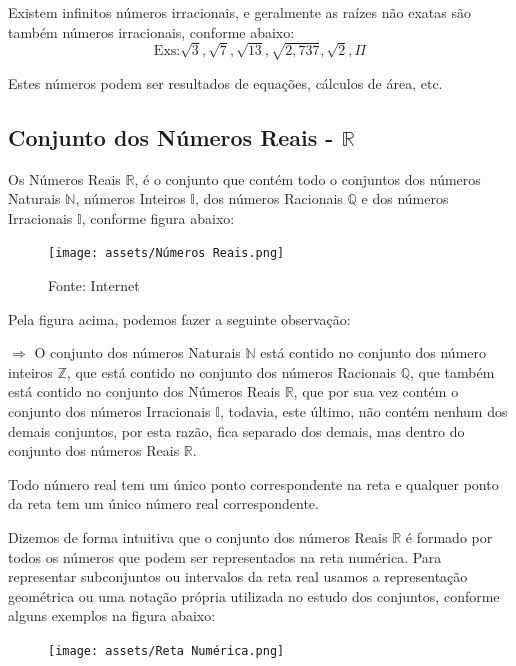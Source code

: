 \begin{multicols*}{2}
	Existem infinitos números irracionais, e geralmente as raízes não exatas são também números irracionais, conforme abaixo:
	\[ \text{Exs:}  \sqrt{3}, \sqrt{7}, \sqrt{13}, \sqrt{2,737}, \sqrt{2}, \Pi \]

	Estes números podem ser resultados de equações, cálculos de área, etc.

	\vfill
	\subsection*{Conjunto dos Números Reais - $\mathbb{R}$}

	Os Números Reais $\mathbb{R}$, é o conjunto que contém todo o conjuntos dos números Naturais $\mathbb{N}$, números Inteiros $\mathbb{I}$, dos números Racionais $\mathbb{Q}$ e dos números Irracionais $\mathbb{I}$, conforme figura abaixo:

	\begin{figure}[H]
		\centering
		\texttt{[image: assets/Números Reais.png]}
		\caption*{Fonte: Internet}
	\end{figure}

	Pela figura acima, podemos fazer a seguinte observação:

	$\Rightarrow$ O conjunto dos números Naturais $\mathbb{N}$ está contido no conjunto dos número inteiros $\mathbb{Z}$, que está contido no conjunto dos números Racionais $\mathbb{Q}$, que também está contido no conjunto dos Números Reais $\mathbb{R}$, que por sua vez contém o conjunto dos números Irracionais $\mathbb{I}$, todavia, este último, não contém nenhum dos demais conjuntos, por esta razão, fica separado dos demais, mas dentro do conjunto dos números Reais $\mathbb{R}$.

	Todo número real tem um único ponto correspondente na reta e qualquer ponto da reta tem um único número real correspondente.

	Dizemos de forma intuitiva que o conjunto dos números Reais $\mathbb{R}$ é formado por todos os números que podem ser representados na reta numérica. Para representar subconjuntos ou intervalos da reta real usamos a representação geométrica ou uma notação própria utilizada no estudo dos conjuntos, conforme alguns exemplos na figura abaixo:

	\begin{figure}[H]
		\centering
		\texttt{[image: assets/Reta Numérica.png]}
	\end{figure}


\end{multicols*}
